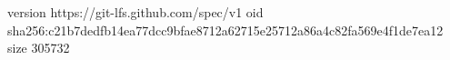 version https://git-lfs.github.com/spec/v1
oid sha256:c21b7dedfb14ea77dcc9bfae8712a62715e25712a86a4c82fa569e4f1de7ea12
size 305732
